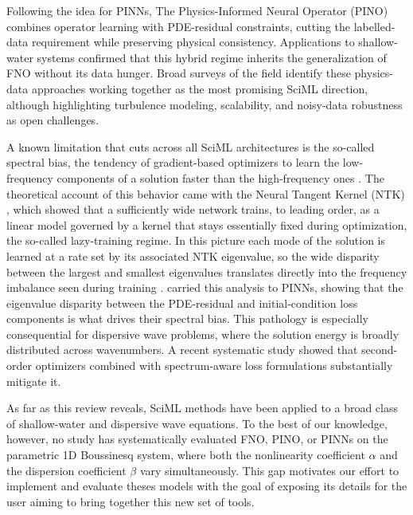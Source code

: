 Following the idea for PINNs, The Physics-Informed Neural Operator (PINO) \parencite{li2023pino} combines operator learning with PDE-residual constraints, cutting the labelled-data requirement while preserving physical consistency. Applications to shallow-water systems \parencite{rosofsky2023} confirmed that this hybrid regime inherits the generalization of FNO without its data hunger. Broad surveys of the field \parencite{piml2023review} identify these physics-data approaches working together as the most promising SciML direction, although highlighting turbulence modeling, scalability, and noisy-data robustness as open challenges.

A known limitation that cuts across all SciML architectures is the so-called spectral bias, the tendency of gradient-based optimizers to learn the low-frequency components of a solution faster than the high-frequency ones \parencite{rahaman2019, xu2019frequency}. The theoretical account of this behavior came with the Neural Tangent Kernel (NTK) \parencite{jacot2018}, which showed that a sufficiently wide network trains, to leading order, as a linear model governed by a kernel that stays essentially fixed during optimization, the so-called lazy-training regime. In this picture each mode of the solution is learned at a rate set by its associated NTK eigenvalue, so the wide disparity between the largest and smallest eigenvalues translates directly into the frequency imbalance seen during training \parencite{arora2019, cao2019, bordelon2020}. \textcite{wang2022ntk} carried this analysis to PINNs, showing that the eigenvalue disparity between the PDE-residual and initial-condition loss components is what drives their spectral bias. This pathology is especially consequential for dispersive wave problems, where the solution energy is broadly distributed across wavenumbers. A recent systematic study \parencite{khodakarami2026} showed that second-order optimizers combined with spectrum-aware loss formulations substantially mitigate it.

As far as this review reveals, SciML methods have been applied to a broad class of shallow-water and dispersive wave equations. To the best of our knowledge, however, no study has systematically evaluated FNO, PINO, or PINNs on the parametric 1D Boussinesq system, where both the nonlinearity coefficient $\alpha$ and the dispersion coefficient $\beta$ vary simultaneously. This gap motivates our effort to implement and evaluate theses models with the goal of exposing its details for the user aiming to bring together this new set of tools.

